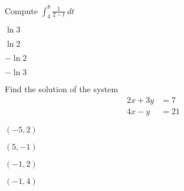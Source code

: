 \begin{readinessAssuranceTest}
\item
Compute \(\int _4 ^8 \frac{1}{2-t}\ dt\)
\begin{multicols}{4}
\begin{readinessAssuranceTestChoices}
\item  \(\ln 3\) %
\item  \(\ln 2\) %
\item  \(-\ln 2\) %
\item  \(-\ln 3\) %
\end{readinessAssuranceTestChoices}
\end{multicols}

\item 
Find the solution of the system
\begin{alignat*}{2}
2x+3y&=7\\
4x-y &= 21
\end{alignat*}
\begin{multicols}{4}
\begin{readinessAssuranceTestChoices}
\item  \((-5,2)\) 
\item  \((5,-1)\) %
\item  \((-1,2)\)
\item  \((-1,4)\) 
\end{readinessAssuranceTestChoices}
\end{multicols}


\end{readinessAssuranceTest}
